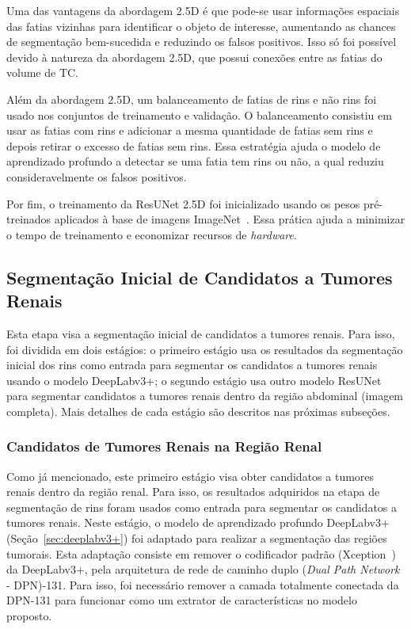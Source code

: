 Uma das vantagens da abordagem 2.5D é que pode-se usar informações espaciais das fatias vizinhas para identificar o objeto de interesse, aumentando as chances de segmentação bem-sucedida e reduzindo os falsos positivos. Isso só foi possível devido à natureza da abordagem 2.5D, que possui conexões entre as fatias do volume de TC. 

Além da abordagem 2.5D, um balanceamento de fatias de rins e não rins foi usado nos conjuntos de treinamento e validação. O balanceamento consistiu em usar as fatias com rins e adicionar a mesma quantidade de fatias sem rins e depois retirar o excesso de fatias sem rins. Essa estratégia ajuda o modelo de aprendizado profundo a detectar se uma fatia tem rins ou não, a qual reduziu consideravelmente os falsos positivos.


Por fim, o treinamento da ResUNet 2.5D foi inicializado usando os pesos pré-treinados aplicados à base de imagens ImageNet~\cite{deng2009imagenet}. Essa prática ajuda a minimizar o tempo de treinamento e economizar recursos de \textit{hardware}.

\subsection{Segmentação Inicial de Candidatos a Tumores Renais}
\label{sec:metodo-segmentacao-inicial-candidatos-tumores-renais}

Esta etapa visa a segmentação inicial de candidatos a tumores renais. Para isso, foi dividida em dois estágios: o primeiro estágio usa os resultados da segmentação inicial dos rins como entrada para segmentar os candidatos a tumores renais usando o modelo DeepLabv3+; o segundo estágio usa outro modelo ResUNet para segmentar candidatos a tumores renais dentro da região abdominal (imagem completa). Mais detalhes de cada estágio são descritos nas próximas subseções.

\subsubsection{Candidatos de Tumores Renais na Região Renal}
\label{sec:metodo-candidatos-tumores-renais-regiao-renal}

Como já mencionado, este primeiro estágio visa obter candidatos a tumores renais dentro da região renal. Para isso, os resultados adquiridos na etapa de segmentação de rins foram usados como entrada para segmentar os candidatos a tumores renais. Neste estágio, o modelo de aprendizado profundo DeepLabv3+ (Seção~\ref{sec:deeplabv3+}) foi adaptado para realizar a segmentação das regiões tumorais. Esta adaptação consiste em remover o codificador padrão (Xception~\cite{chollet2017xception}) da DeepLabv3+, pela arquitetura de rede de caminho duplo (\textit{Dual Path Network} - DPN)-131. Para isso, foi necessário remover a camada totalmente conectada da DPN-131 para funcionar como um extrator de características no modelo proposto.

